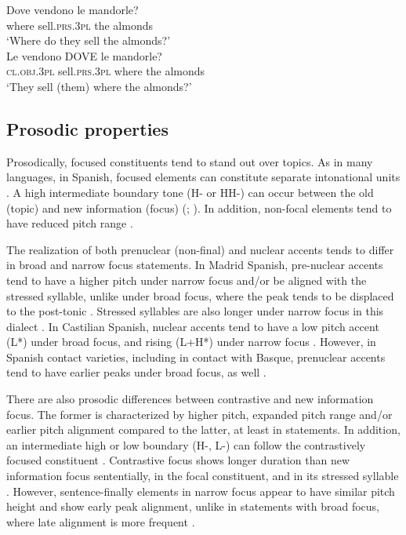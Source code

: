 \documentclass[output=paper,colorlinks,citecolor=brown,draftmode]{langscibook}
\begin{document}
\ea \label{13:ex:11}%
\ea \gll Dove vendono le mandorle?\\
where sell.\textsc{prs}.3\textsc{pl}  the almonds\\ 
\glt ‘Where do they sell the almonds?’\\
\ex \gll  	Le vendono DOVE le mandorle?\\
\textsc{cl}.\textsc{obj}.3\textsc{pl} sell.\textsc{prs}.3\textsc{pl}  where  the almonds\\ 
\glt ‘They sell (them) where the almonds?’\\
\z
\z



\subsection{Prosodic properties}
Prosodically, focused constituents tend to stand out over topics. As in many languages, in Spanish, focused elements can constitute separate intonational units \citep{Gutiérrez-Bravo2008}. A high intermediate boundary tone (H- or HH-) can occur between the old (topic) and new information (focus) (\citealp[268--270]{Hualde2014}; \citealp[369]{hualde2015}). In addition, non-focal elements tend to have reduced pitch range \citep[see for example][]{delamota1997, Face2002a}.

The realization of both prenuclear (non-final) and nuclear accents tends to differ in broad and narrow focus statements. In Madrid Spanish, pre-nuclear accents tend to have a higher pitch under narrow focus and/or be aligned with the stressed syllable, unlike under broad focus, where the peak tends to be displaced to the post-tonic \citep[][]{Face2001}. Stressed syllables are also longer under narrow focus in this dialect \citep{Face2000}. In Castilian Spanish, nuclear accents tend to have a low pitch accent (L*) under broad focus, and rising (L+H*) under narrow focus \citep{Estebas-VilaplanaPrieto}. However, in Spanish contact varieties, including in contact with Basque, prenuclear accents tend to have earlier peaks under broad focus, as well \citep{Elordieta2003,orourke2012}.

There are also prosodic differences between contrastive and new information focus. The former is characterized by higher pitch, expanded pitch range and/or earlier pitch alignment compared to the latter, at least in statements. In addition, an intermediate high or low boundary (H-, L-) can follow the contrastively focused constituent \citep{delamota1997,Face2002a,Face2002b}. Contrastive focus shows longer duration than new information focus sententially, in the focal constituent, and in its stressed syllable \citep{Chung2012}. However, sentence-finally elements in narrow focus appear to have similar pitch height and show early peak alignment, unlike in statements with broad focus, where late alignment is more frequent \citep{Domínguez2004}.
\end{document}
